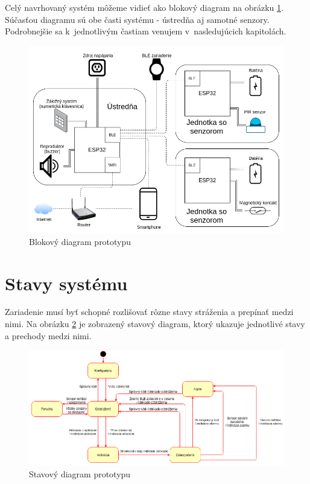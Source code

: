Celý navrhovaný systém môžeme vidieť ako blokový diagram na obrázku \ref{fig:navrh_diagram}. Súčasťou diagramu sú obe časti systému - ústredňa aj samotné senzory. Podrobnejšie sa k~jednotlivým častiam venujem v~nasledujúcich kapitolách.

\begin{figure}[ht]
    \centering
    \includegraphics[scale=0.4]{obrazky-figures/block_diagram.png}
    \caption{Blokový diagram prototypu}
    \label{fig:navrh_diagram}
\end{figure}

\section{Stavy systému}

Zariadenie musí byť schopné rozlišovať rôzne stavy stráženia a prepínať medzi nimi. Na obrázku \ref{fig:state_diagram} je zobrazený stavový diagram, ktorý ukazuje jednotlivé stavy a prechody medzi nimi.

\begin{figure}[!ht]
    \centering
    \includegraphics[width=\linewidth]{obrazky-figures/state_diagram.png}
    \caption{Stavový diagram prototypu}
    \label{fig:state_diagram}
\end{figure}

